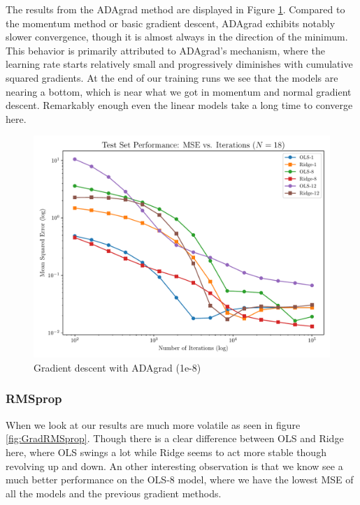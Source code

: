 \documentclass[twocolumn,aps]{revtex4}
\begin{document}
The results from the ADAgrad method are displayed in Figure \ref{fig:GradADAgrad}. 
Compared to the momentum method or basic gradient descent, ADAgrad exhibits notably slower convergence, though it is almost always in the direction of the minimum. 
This behavior is primarily attributed to ADAgrad's mechanism, where the learning rate starts relatively small and progressively diminishes with cumulative squared gradients.
At the end of our training runs we see that the models are nearing a bottom, which is near what we got in momentum and normal gradient descent.
Remarkably enough even the linear models take a long time to converge here.
\\

\begin{figure}[h]
    \centering
    \includegraphics[width=.95 \linewidth]{Figures/OLS_Ridge_ADAgrad.pdf}
    \caption{Gradient descent with ADAgrad (1e-8)}
    \label{fig:GradADAgrad}
\end{figure}


\subsubsection{RMSprop}
When we look at our results are much more volatile as seen in figure \ref{fig:GradRMSprop}.
Though there is a clear difference between OLS and Ridge here, where OLS swings a lot while Ridge seems to act more stable though revolving up and down.
An other interesting observation is that we know see a much better performance on the OLS-8 model, where we have the lowest MSE of all the models and the previous gradient methods.
\\
\end{document}
